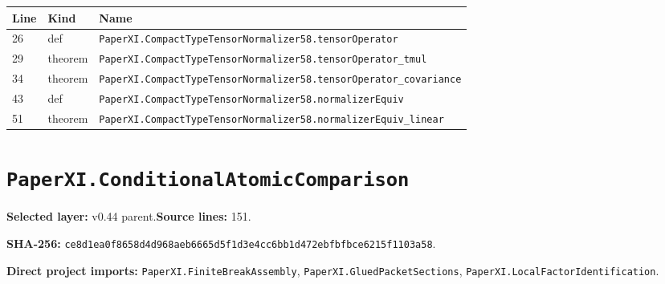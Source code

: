 \documentclass[10pt,oneside]{book}
\begin{document}
\begin{longtable}{@{}p{}p{}p{}@{}}\toprule Line&Kind&Name\\\midrule\endhead

26&def&\nolinkurl{PaperXI.CompactTypeTensorNormalizer58.tensorOperator}\\

29&theorem&\nolinkurl{PaperXI.CompactTypeTensorNormalizer58.tensorOperator_tmul}\\

34&theorem&\nolinkurl{PaperXI.CompactTypeTensorNormalizer58.tensorOperator_covariance}\\

43&def&\nolinkurl{PaperXI.CompactTypeTensorNormalizer58.normalizerEquiv}\\

51&theorem&\nolinkurl{PaperXI.CompactTypeTensorNormalizer58.normalizerEquiv_linear}\\

\bottomrule\end{longtable}

\section{\texorpdfstring{\nolinkurl{PaperXI.ConditionalAtomicComparison}}{PaperXI.ConditionalAtomicComparison}}\label{module:PaperXI.ConditionalAtomicComparison}

\textbf{Selected layer:} v0.44 parent.\quad\textbf{Source lines:} 151.\par\textbf{SHA-256:} {\scriptsize\nolinkurl{ce8d1ea0f8658d4d968aeb6665d5f1d3e4cc6bb1d472ebfbfbce6215f1103a58}}.


\textbf{Direct project imports:} \nolinkurl{PaperXI.FiniteBreakAssembly}, \nolinkurl{PaperXI.GluedPacketSections}, \nolinkurl{PaperXI.LocalFactorIdentification}.
\end{document}
